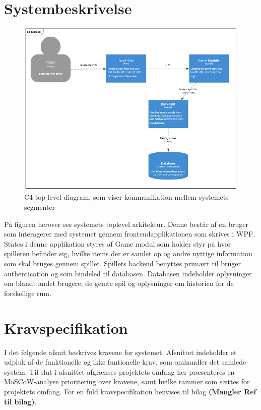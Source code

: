 \section{Systembeskrivelse}

\begin{figure}[H]
\centering
\includegraphics[width = \textwidth]{02-Body/Images/C4TopLvlDB}
\caption{C4 top level diagram, som viser kommunikation mellem systemets segmenter}
\label{fig:C4TopLvlDB}
\end{figure}

På figuren herover ses systemets toplevel arkitektur.
Denne består af en bruger som interagerer med systemet gennem frontendapplikationen som skrives i WPF. States i denne applikation styres af Game modul som holder styr på hvor spilleren befinder sig, hvilke items der er samlet op og andre nyttige information som skal bruges gennem spillet.
Spillets backend benyttes primært til bruger authentication og som bindeled til databasen.
Databasen indeholder oplysninger om blandt andet brugere, de gemte spil og oplysninger om historien for de forskellige rum.

\newpage


\section{Kravspecifikation}
\label{sec:kravspec}

I det følgende afsnit beskrives kravene for systemet. Afsnittet indeholder et udpluk af de funktionelle og ikke funtionelle krav, som omhandler det samlede system. Til slut i afsnittet afgrænses projektets omfang her præsenteres en MoSCoW-analyse prioritering over kravene, samt hvilke rammer som sættes for projektets omfang. For en fuld kravspecifikation henvises til bilag \textbf{(Mangler Ref til bilag)}.\\  


